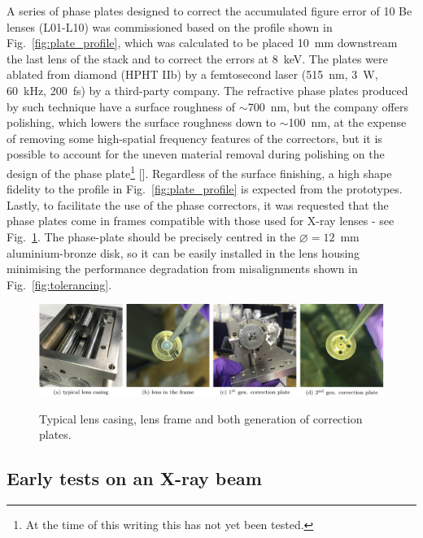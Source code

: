 \begin{refsection}
A series of phase plates designed to correct the accumulated figure error of 10 Be lenses (L01-L10) was commissioned based on the profile shown in Fig.~\ref{fig:plate_profile}, which was calculated to be placed 10~mm downstream the last lens of the stack and to correct the errors at 8~keV. The plates were ablated from diamond (HPHT IIb) by a femtosecond laser (515~nm, 3~W, 60~kHz, 200~fs) by a third-party company. The refractive phase plates produced by such technique have a surface roughness of $\sim$700~nm, but the company offers polishing, which lowers the surface roughness down to $\sim$100~nm, at the expense of removing some high-spatial frequency features of the correctors, but it is possible to account for the uneven material removal during polishing on the design of the phase plate\footnote{At the time of this writing this has not yet been tested.} [\cite{Antipov2020}]. Regardless of the surface finishing, a high shape fidelity to the profile in Fig.~\ref{fig:plate_profile} is expected from the prototypes. Lastly, to facilitate the use of the phase correctors, it was requested that the phase plates come in frames compatible with those used for X-ray lenses - see Fig.~\ref{fig:potpourri}. The phase-plate should be precisely centred in the $\diameter=12$~mm aluminium-bronze disk, so it can be easily installed in the lens housing minimising the performance degradation from misalignments shown in Fig.~\ref{fig:tolerancing}.

\begin{figure}[t]
        \centering
        {\includegraphics[width=1\linewidth]{figures/compressed/ppr.pdf}}
        \caption[Lens casing, frame and correction plates]{Typical lens casing, lens frame and both generation of correction plates. }\label{fig:potpourri}
\end{figure}
\subsection{Early tests on an X-ray beam}\label{sec:prototype_testing}


\end{refsection}
